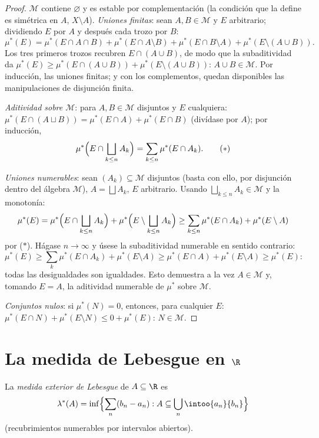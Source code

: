 \begin{proof}
$\mathcal M$ contiene $\varnothing$ y es estable por complementación (la
condición que la define es simétrica en $A$, $X\setminus A$).
\emph{Uniones finitas}: sean $A, B \in \mathcal
M$ y $E$ arbitrario; dividiendo $E$ por $A$ y después cada trozo por
$B$:
\[
\mu^*(E) = \mu^*(E\cap A\cap B) + \mu^*(E\cap A\setminus B) +
\mu^*(E\cap B\setminus A) + \mu^*(E\setminus(A\cup B)).
\]
Los tres primeros trozos recubren $E \cap (A \cup B)$, de modo que la
subaditividad da $\mu^*(E) \geq \mu^*(E\cap(A\cup B)) +
\mu^*(E\setminus(A\cup B))$: $A \cup B \in \mathcal M$. Por inducción,
las uniones finitas; y con los complementos, quedan disponibles las
manipulaciones de disjunción finita.

\emph{Aditividad sobre $\mathcal M$}: para $A, B \in
\mathcal M$ disjuntos y $E$ cualquiera:
$\mu^*(E\cap(A\sqcup B)) = \mu^*(E\cap
A) + \mu^*(E \cap B)$ (divídase por $A$); por inducción,
\[
\mu^*\Bigl(E \cap \bigsqcup_{k\leq n}A_k\Bigr)
= \sum_{k\leq n}\mu^*(E\cap A_k).
\tag{$*$}
\]

\emph{Uniones numerables}: sean $(A_k) \subseteq \mathcal M$ disjuntos
(basta con ello, por disjunción dentro del álgebra $\mathcal M$),
$A = \bigsqcup A_k$, $E$ arbitrario. Usando
$\bigsqcup_{k\leq n}A_k \in \mathcal M$ y la monotonía:
\[
\mu^*(E) = \mu^*\Bigl(E\cap\bigsqcup_{k\leq n}A_k\Bigr) +
\mu^*\Bigl(E\setminus\bigsqcup_{k\leq n}A_k\Bigr)
\geq \sum_{k \leq n}\mu^*(E\cap A_k) + \mu^*(E\setminus A)
\]
por ($*$). Hágase $n \to \infty$ y úsese la subaditividad numerable en
sentido contrario:
\[
\mu^*(E) \geq \sum_{k}\mu^*(E\cap A_k) + \mu^*(E\setminus A)
\geq \mu^*(E \cap A) + \mu^*(E\setminus A) \geq \mu^*(E):
\]
todas las desigualdades son igualdades. Esto demuestra a la vez $A \in
\mathcal M$ y, tomando $E = A$, la aditividad numerable de $\mu^*$ sobre
$\mathcal M$.

\emph{Conjuntos nulos}: si $\mu^*(N) = 0$, entonces, para cualquier $E$:
$\mu^*(E \cap N) + \mu^*(E\setminus N) \leq 0 + \mu^*(E)$:
$N \in \mathcal M$.
\end{proof}

\section{La medida de Lebesgue en \texorpdfstring{$\R$}{R}}

\begin{definition}\label{def:b3:measure:lebesgueouter}
La \emph{medida exterior de Lebesgue} de $A
\subseteq \R$ es
\[
\lambda^*(A) = \inf\Bigl\{\sum_{n} (b_n - a_n) :
A \subseteq \bigcup_n \intoo{a_n}{b_n}\Bigr\}
\]
(recubrimientos numerables por intervalos abiertos).
\end{definition}

